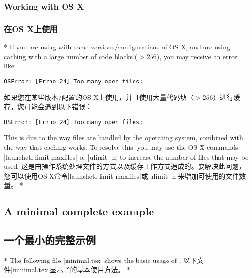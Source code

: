 \begin{paracol}{2}
\subsubsection*{Working with OS X}
\switchcolumn
\subsubsection*{在OS X上使用}
\switchcolumn[0]*%
If you are using  with some versions/configurations of OS X, and are using caching with a large number of code blocks ($>256$), you may receive an error like
\begin{Verbatim}
OSError: [Errno 24] Too many open files:
\end{Verbatim}
\switchcolumn
如果您在某些版本/配置的OS X上使用，并且使用大量代码块（$>256$）进行缓存，您可能会遇到以下错误：
\begin{Verbatim}
OSError: [Errno 24] Too many open files:
\end{Verbatim}
\switchcolumn
This is due to the way files are handled by the operating system, combined with the way that caching works.  To resolve this, you may use the OS X commands |launchctl limit maxfiles| or |ulimit -n| to increase the number of files that may be used.
\switchcolumn
这是由操作系统处理文件的方式以及缓存工作方式造成的。要解决此问题，您可以使用OS X命令|launchctl limit maxfiles|或|ulimit -n|来增加可使用的文件数量。
\switchcolumn[0]*%
\subsection{A minimal complete example}
\switchcolumn
\subsection{一个最小的完整示例}
\switchcolumn[0]*%
The following file |minimal.tex| shows the basic usage of .
\switchcolumn
以下文件|minimal.tex|显示了的基本使用方法。
\switchcolumn[0]*%
\end{paracol}
